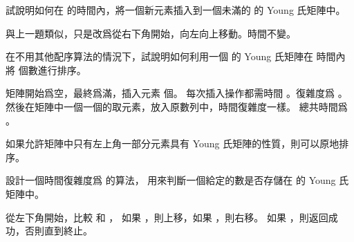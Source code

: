 \startitem
試說明如何在  的時間內，將一個新元素插入到一個未滿的  的 Young 氏矩陣中。

\startANSWER
與上一題類似，只是改爲從右下角開始，向左向上移動。時間不變。
\stopANSWER
\stopitem

\startitem
在不用其他配序算法的情況下，試說明如何利用一個  的 Young 氏矩陣在  時間內
將  個數進行排序。

\startANSWER
矩陣開始爲空，最終爲滿，插入元素  個。
每次插入操作都需時間 。復雜度爲 。
然後在矩陣中一個一個的取元素，放入原數列中，時間復雜度一樣。
總共時間爲 。

如果允許矩陣中只有左上角一部分元素具有 Young 氏矩陣的性質，則可以原地排序。
\stopANSWER
\stopitem

\startitem
設計一個時間復雜度爲  的算法，
用來判斷一個給定的數是否存儲在  的 Young 氏矩陣中。

\startANSWER
從左下角開始，比較  和 ，
如果 ，則上移，如果 ，則右移。
如果 ，則返回成功，否則直到終止。
\stopANSWER
\stopitem

\stopigBase
\stopPROBLEM

\stopsubject
